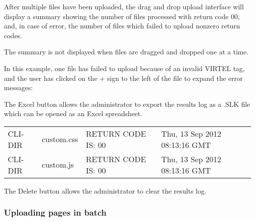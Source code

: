 \documentclass[letterpaper,10pt,english]{sphinxmanual}
\begin{document}

After multiple files have been uploaded, the drag and drop upload interface will display a summary showing the number of files processed with return code 00, and, in case of error, the number of files which failed to upload nonzero return codes.

The summary is not displayed when files are dragged and dropped one at a time.

In this example, one file has failed to upload because of an invalid VIRTEL tag, and the user has clicked on the + sign to the left of the file to expand the error messages:




 The Excel button allows the administrator to export the results log as a .SLK file which can be opened as an Excel spreadsheet.


\begin{savenotes}\sphinxattablestart
\centering
\begin{tabulary}{\linewidth}[t]{|T|T|T|T|}
\hline
{}\relax &\relax &\relax &\relax \\
\hline
CLI-DIR
&
custom.css
&
RETURN CODE IS: 00
&
Thu, 13 Sep 2012 08:13:16 GMT
\\
\hline
CLI-DIR
&
custom.js
&
RETURN CODE IS: 00
&
Thu, 13 Sep 2012 08:13:16 GMT
\\
\hline
\end{tabulary}
\par
\sphinxattableend\end{savenotes}

 The Delete button allows the administrator to clear the results log.


\subsubsection{Uploading pages in batch}
\label{\detokenize{User_Guide:uploading-pages-in-batch}}
\end{document}
